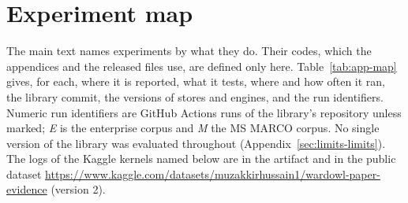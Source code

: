 
\section{Experiment map}\label{app:map}

The main text names experiments by what they do. Their codes, which the appendices and the released files
use, are defined only here. Table~\ref{tab:app-map} gives, for each, where it is reported, what it tests, where
and how often it ran, the library commit, the versions of stores and engines, and the run identifiers. Numeric run
identifiers are GitHub Actions runs of the library's repository unless marked; \emph{E} is the enterprise corpus and
\emph{M} the MS MARCO corpus. No single version of the library was evaluated throughout
(Appendix~\ref{sec:limits-limits}). The logs of the Kaggle kernels named below are in the artifact and in the public dataset
\url{https://www.kaggle.com/datasets/muzakkirhussain1/wardowl-paper-evidence} (version 2).

